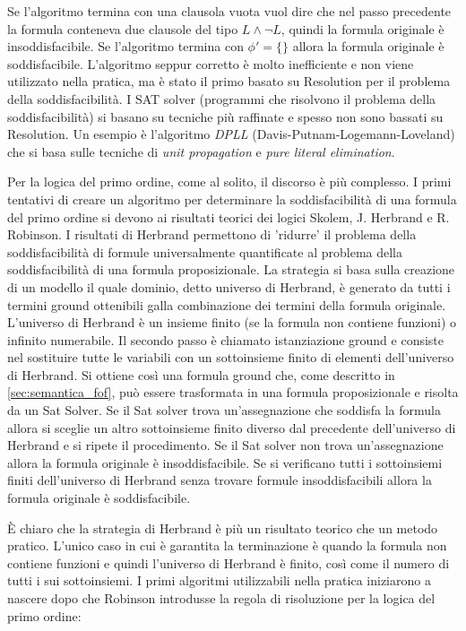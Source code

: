 \documentclass[./main.tex]{subfiles}
\begin{document}
Se l'algoritmo termina con una clausola vuota vuol dire che nel passo precedente la formula conteneva due clausole del tipo $L \land \lnot L$,
quindi la formula originale è insoddisfacibile. Se l'algoritmo termina con $\phi' = \{\}$ allora la formula originale è soddisfacibile.
L'algoritmo seppur corretto è molto inefficiente e non viene utilizzato nella pratica, 
ma è stato il primo basato su Resolution per il problema della soddisfacibilità. 
I SAT solver (programmi che risolvono il problema della soddisfacibilità) si basano su tecniche più raffinate e spesso non sono bassati su Resolution.
Un esempio è l'algoritmo \textit{DPLL} (Davis-Putnam-Logemann-Loveland) che si basa sulle tecniche di \textit{unit propagation} e \textit{pure literal elimination}.


Per la logica del primo ordine, come al solito, il discorso è più complesso.
I primi tentativi di creare un algoritmo per determinare la soddisfacibilità di una formula del primo ordine si
devono ai risultati teorici dei logici 
Skolem, J. Herbrand e R. Robinson. 
I risultati di Herbrand permettono di 'ridurre' il problema della soddisfacibilità di formule universalmente quantificate
al problema della soddisfacibilità di una formula proposizionale. La strategia si basa sulla creazione di un modello 
il quale dominio, detto universo di Herbrand, è generato da tutti i termini ground ottenibili galla combinazione dei termini della formula originale.
L'universo di Herbrand è un insieme finito (se la formula non contiene funzioni) o infinito numerabile. Il secondo passo è 
chiamato istanziazione ground e consiste nel sostituire tutte le variabili con un sottoinsieme finito di elementi dell'universo di Herbrand.
Si ottiene così una formula ground che, come descritto in \ref{sec:semantica_fof}, può essere trasformata in una formula proposizionale e risolta da un Sat Solver. 
Se il Sat solver trova un'assegnazione che soddisfa la formula allora si sceglie un altro sottoinsieme finito diverso dal precedente dell'universo di Herbrand 
e si ripete il procedimento. Se il Sat solver non trova un'assegnazione allora la formula originale è insoddisfacibile.
Se si verificano tutti i sottoinsiemi finiti dell'universo di Herbrand senza trovare formule insoddisfacibili allora la formula originale è soddisfacibile.

È chiaro che la strategia di Herbrand è più un risultato teorico che un metodo pratico.
L'unico caso in cui è garantita la terminazione è quando la formula non contiene funzioni
e quindi l'universo di Herbrand è finito, così come il numero di tutti i sui sottoinsiemi.
I primi algoritmi utilizzabili nella pratica iniziarono a nascere dopo che Robinson introdusse la regola di risoluzione per la logica del primo ordine:
\end{document}

